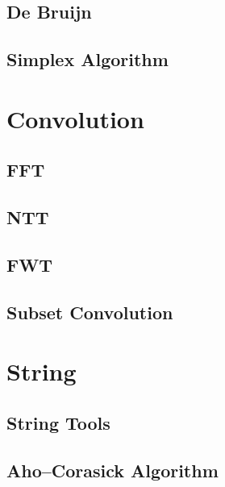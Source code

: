 \documentclass[a4paper,10pt,twocolumn,oneside]{article}
\begin{document}
\subsection{De Bruijn}


\subsection{Simplex Algorithm}


\section{Convolution}

\subsection{FFT}


\subsection{NTT}


\subsection{FWT}


\subsection{Subset Convolution}


%



\section{String}

\subsection{String Tools}


\subsection{Aho–Corasick Algorithm}

\end{document}
